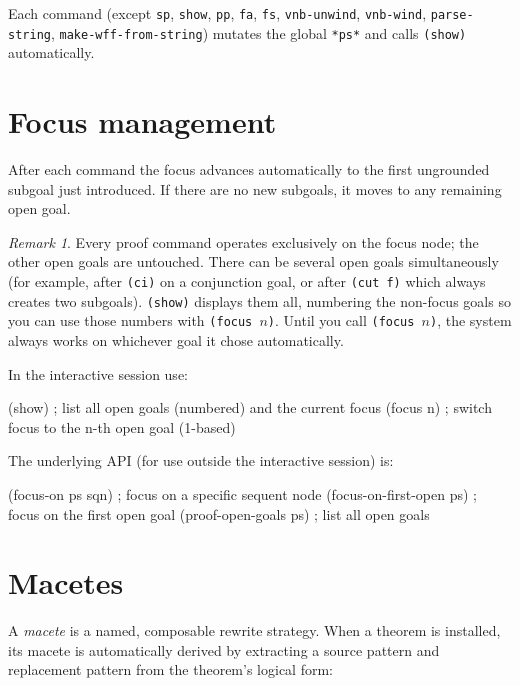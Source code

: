\documentclass{amsbook}[openany]
\theoremstyle{definition}
\theoremstyle{remark}
\newtheorem{remark}{Remark}[chapter]
\theoremstyle{remark}
\begin{document}
Each command (except \texttt{sp}, \texttt{show}, \texttt{pp}, \texttt{fa},
\texttt{fs}, \texttt{vnb-unwind}, \texttt{vnb-wind}, \texttt{parse-string},
\texttt{make-wff-from-string})
mutates the global \texttt{*ps*} and calls \texttt{(show)} automatically.

\section{Focus management}

After each command the focus advances automatically to the first
ungrounded subgoal just introduced.  If there are no new subgoals, it
moves to any remaining open goal.

\begin{remark}
Every proof command operates exclusively on the focus node; the other
open goals are untouched.  There can be several open goals simultaneously
(for example, after \texttt{(ci)} on a conjunction goal, or after
\texttt{(cut f)} which always creates two subgoals).  \texttt{(show)}
displays them all, numbering the non-focus goals so you can use those
numbers with \texttt{(focus $n$)}.  Until you call \texttt{(focus $n$)},
the system always works on whichever goal it chose automatically.
\end{remark}

In the interactive session use:
\begin{VNBcode}
(show)       ; list all open goals (numbered) and the current focus
(focus n)    ; switch focus to the n-th open goal (1-based)
\end{VNBcode}

The underlying API (for use outside the interactive session) is:
\begin{VNBcode}
(focus-on ps sqn)            ; focus on a specific sequent node
(focus-on-first-open ps)     ; focus on the first open goal
(proof-open-goals ps)        ; list all open goals
\end{VNBcode}

\section{Macetes}

A \emph{macete} is a named, composable rewrite strategy.  When a
theorem is installed, its macete is automatically derived by extracting a
source pattern and replacement pattern from the theorem's logical form:
\end{document}
